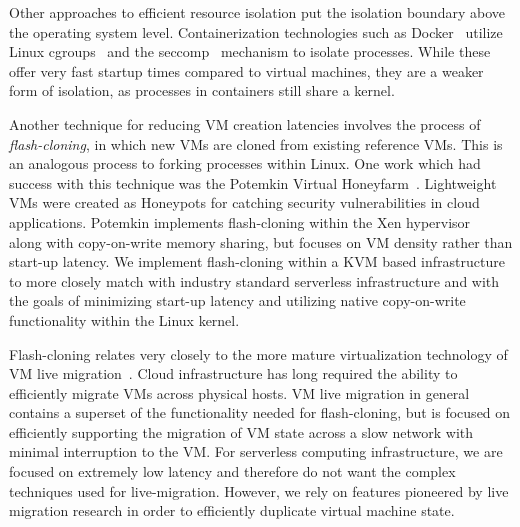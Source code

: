 Other approaches to efficient resource isolation put the isolation boundary
above the operating system level. Containerization technologies such as
Docker~\cite{docker} utilize Linux cgroups~\cite{cgroups} and the
seccomp~\cite{seccomp} mechanism to isolate processes. While these offer very
fast startup times compared to virtual machines, they are a weaker form of
isolation, as processes in containers still share a kernel.

Another technique for reducing VM creation latencies involves the process of
\emph{flash-cloning}, in which new VMs are cloned from existing reference VMs.
This is an analogous process to forking processes within Linux. One work which
had success with this technique was the Potemkin Virtual
Honeyfarm~\cite{potemkin}. Lightweight VMs were created as Honeypots for
catching security vulnerabilities in cloud applications. Potemkin implements
flash-cloning within the Xen hypervisor~\cite{xen} along with copy-on-write
memory sharing, but focuses on VM density rather than start-up latency. We
implement flash-cloning within a KVM based infrastructure to more closely match
with industry standard serverless infrastructure and with the goals of
minimizing start-up latency and utilizing native copy-on-write functionality
within the Linux kernel.

 Flash-cloning relates very closely to the more
mature virtualization technology of VM live
migration~\cite{post-copy-migration}\cite{snowflock}. Cloud infrastructure has
long required the ability to efficiently migrate VMs across physical hosts. VM
live migration in general contains a superset of the functionality needed for
flash-cloning, but is focused on efficiently supporting the migration of VM
state across a slow network with minimal interruption to the VM. For serverless
computing infrastructure, we are focused on extremely low latency and therefore
do not want the complex techniques used for live-migration. However, we rely on
features pioneered by live migration research in order to efficiently duplicate
virtual machine state.

